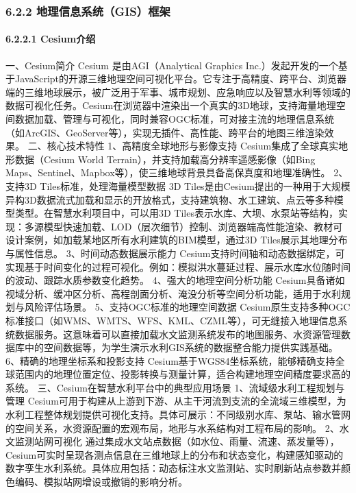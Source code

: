 {\subsubsection{6.2.2 地理信息系统（GIS）框架}\label{ux5730ux7406ux4fe1ux606fux7cfbux7edfgisux6846ux67b6} \paragraph{6.2.2.1
Cesium介绍}\label{cesiumux4ecbux7ecd} 一、Cesium简介 Cesium 是由AGI（Analytical Graphics
Inc.）发起开发的一个基于JavaScript的开源三维地理空间可视化平台。它专注于高精度、跨平台、浏览器端的三维地球展示，被广泛用于军事、城市规划、应急响应以及智慧水利等领域的数据可视化任务。Cesium在浏览器中渲染出一个真实的3D地球，支持海量地理空间数据加载、管理与可视化，同时兼容OGC标准，可对接主流的地理信息系统（如ArcGIS、GeoServer等），实现无插件、高性能、跨平台的地图三维渲染效果。
二、核心技术特性 1、高精度全球地形与影像支持 Cesium集成了全球真实地形数据（Cesium World Terrain），并支持加载高分辨率遥感影像（如Bing
Maps、Sentinel、Mapbox等），使三维地球背景具备高保真度和地理准确性。 2、支持3D Tiles标准，处理海量模型数据 3D
Tiles是由Cesium提出的一种用于大规模异构3D数据流式加载和显示的开放格式，支持建筑物、水工建筑、点云等多种模型类型。在智慧水利项目中，可以用3D
Tiles表示水库、大坝、水泵站等结构，实现：多源模型快速加载、LOD（层次细节）控制、浏览器端高性能渲染、教材可设计案例，如加载某地区所有水利建筑的BIM模型，通过3D Tiles展示其地理分布与属性信息。 3、时间动态数据展示能力
Cesium支持时间轴和动态数据绑定，可实现基于时间变化的过程可视化。例如：模拟洪水蔓延过程、展示水库水位随时间的波动、跟踪水质参数变化趋势。 4、强大的地理空间分析功能
Cesium具备诸如视域分析、缓冲区分析、高程剖面分析、淹没分析等空间分析功能，适用于水利规划与风险评估场景。 5、支持OGC标准的地理空间数据
Cesium原生支持多种OGC标准接口（如WMS、WMTS、WFS、KML、CZML等），可无缝接入地理信息系统数据服务。这意味着可以直接加载水文监测系统发布的地图服务、水资源管理数据库中的空间数据等，为学生演示水利GIS系统的数据整合能力提供实践基础。
6、精确的地理坐标系和投影支持 Cesium基于WGS84坐标系统，能够精确支持全球范围内的地理位置定位、投影转换与测量计算，适合构建地理空间精度要求高的系统。 三、Cesium在智慧水利平台中的典型应用场景 1、流域级水利工程规划与管理
Cesium可用于构建从上游到下游、从主干河流到支流的全流域三维模型，为水利工程整体规划提供可视化支持。具体可展示：不同级别水库、泵站、输水管网的空间关系，水资源配置的宏观布局，地形与水系结构对工程布局的影响。 2、水文监测站网可视化
通过集成水文站点数据（如水位、雨量、流速、蒸发量等），Cesium可实时呈现各测点信息在三维地球上的分布和状态变化，构建感知驱动的数字孪生水利系统。具体应用包括：动态标注水文监测站、实时刷新站点参数并颜色编码、模拟站网增设或撤销的影响分析。
}
